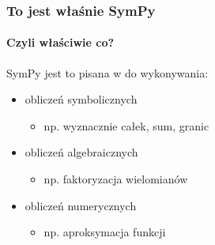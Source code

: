 \documentclass{beamer}
\begin{document}
\begin{frame}
    \frametitle{To jest właśnie SymPy}
    \framesubtitle{Czyli właściwie co?}

    SymPy jest to  pisana w  do wykonywania:
    \begin{itemize}
        \item obliczeń symbolicznych
            \begin{itemize}
                \item np. wyznacznie całek, sum, granic
            \end{itemize}
        \item obliczeń algebraicznych
            \begin{itemize}
                \item np. faktoryzacja wielomianów
            \end{itemize}
        \item obliczeń numerycznych
            \begin{itemize}
                \item np. aproksymacja funkcji
            \end{itemize}
    \end{itemize}
\end{frame}
\end{document}
